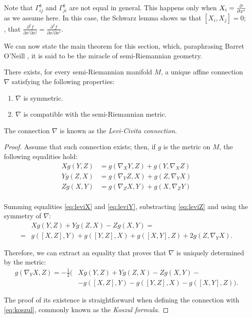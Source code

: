 Note that $\Gamma^k_{ij}$ and $\Gamma^k_{ji}$ are not equal in general. This happens only when $X_i = \frac{\partial^{} }{\partial x^i}$ as we assume here. In this case, the Schwarz lemma shows us that $[X_i, X_j] = 0$; \ie, that $\frac{\partial^2 f}{\partial x^i \partial x^j} = \frac{\partial^2 f}{\partial x^j \partial x^i}$.

We can now state the main theorem for this section, which, paraphrasing Barret O'Neill \cite[p. 60]{oneill83}, it is said to be the miracle of semi-Riemannian geometry.

\begin{theorem}
	\label{theo:levicivita}
	There exists, for every semi-Riemannian manifold $M$, a unique affine connection $\nabla$ satisfying the following properties:
	\begin{enumerate}
		\item $\nabla$ is symmetric.
		\item $\nabla$ is compatible with the semi-Riemannian metric.
	\end{enumerate}

	The connection $\nabla$ is known as the \emph{Levi-Civita connection}.
\end{theorem}

\begin{proof}
	Assume that such  connection exists; then, if $g$ is the metric on $M$, the following equalities hold:
	\begin{align}
		\label{eq:leviX}
		X g(Y,Z) &= g(\nabla_X Y, Z) + g(Y, \nabla_X Z) \\
		\label{eq:leviY}
		Y g(Z,X) &= g(\nabla_Y Z, X) + g(Z, \nabla_Y X) \\
		\label{eq:leviZ}
		Z g(X,Y) &= g(\nabla_Z X, Y) + g(X, \nabla_Z Y) \\
	\end{align}

	Summing equalities \ref{eq:leviX} and \ref{eq:leviY}, substracting \ref{eq:leviZ} and using the symmetry of $\nabla$:
	\begin{align*}
		&X g(Y,Z) + Y g(Z,X) - Z g(X,Y) = \\
		= &g([X,Z], Y) + g([Y,Z], X) + g([X,Y], Z) + 2g(Z, \nabla_Y X).
	\end{align*}

	Therefore, we can extract an equality that proves that $\nabla$ is uniquely determined by the metric:
	\begin{align}
		\label{eq:koszul}
		g(\nabla_Y X, Z) = -\frac{1}{2} \big(&X g(Y,Z) + Y g(Z,X) - Zg(X,Y) - \\
		\nonumber
		&- g([X,Z], Y) - g([Y,Z], X) - g([X,Y],Z) \big).
	\end{align}

	The proof of its existence is straightforward when defining the connection with \autoref{eq:koszul}, commonly known as the \emph{Koszul formula}.
\end{proof}


